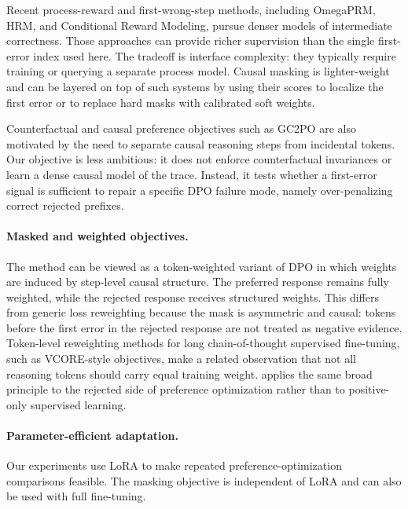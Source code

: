Recent process-reward and first-wrong-step methods, including OmegaPRM, HRM, and Conditional Reward Modeling, pursue denser models of intermediate correctness. Those approaches can provide richer supervision than the single first-error index used here. The tradeoff is interface complexity: they typically require training or querying a separate process model. Causal masking is lighter-weight and can be layered on top of such systems by using their scores to localize the first error or to replace hard masks with calibrated soft weights.

Counterfactual and causal preference objectives such as GC2PO are also motivated by the need to separate causal reasoning steps from incidental tokens. Our objective is less ambitious: it does not enforce counterfactual invariances or learn a dense causal model of the trace. Instead, it tests whether a first-error signal is sufficient to repair a specific DPO failure mode, namely over-penalizing correct rejected prefixes.

\paragraph{Masked and weighted objectives.}
The method can be viewed as a token-weighted variant of DPO in which weights are induced by step-level causal structure. The preferred response remains fully weighted, while the rejected response receives structured weights. This differs from generic loss reweighting because the mask is asymmetric and causal: tokens before the first error in the rejected response are not treated as negative evidence. Token-level reweighting methods for long chain-of-thought supervised fine-tuning, such as VCORE-style objectives, make a related observation that not all reasoning tokens should carry equal training weight. \cmdpo{} applies the same broad principle to the rejected side of preference optimization rather than to positive-only supervised learning.

\paragraph{Parameter-efficient adaptation.}
Our experiments use LoRA \citep{hu2022lora} to make repeated preference-optimization comparisons feasible. The masking objective is independent of LoRA and can also be used with full fine-tuning.
